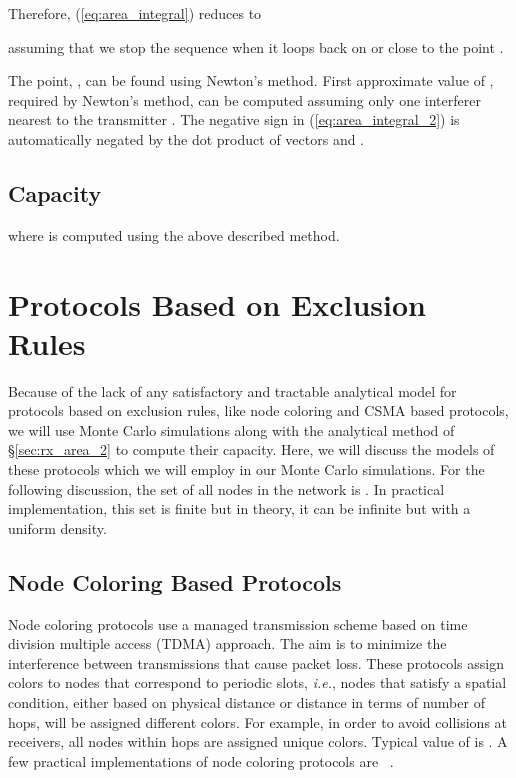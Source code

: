 \documentclass[12pt,english]{article}
\begin{document}
Therefore, (\ref{eq:area_integral}) reduces to

assuming that we stop the sequence  when it loops back on or close to the point . 

The point, \mbox{}, can be found using Newton's method. First approximate value of , required by Newton's method, can be computed assuming only one interferer nearest to the transmitter . The negative sign in (\ref{eq:area_integral_2}) is automatically negated by the dot product of vectors  and .

\subsection{Capacity}

 
where  is computed using the above described method. 

\section{Protocols Based on Exclusion Rules}
\label{sec:practical}

Because of the lack of any satisfactory and tractable analytical model for protocols based on exclusion rules, like node coloring and CSMA based protocols, we will use Monte Carlo simulations along with the analytical method of \S \ref{sec:rx_area_2} to compute their capacity. Here, we will discuss the models of these protocols which we will employ in our Monte Carlo simulations. For the following discussion, the set of all nodes in the network is . In practical implementation, this set is finite but in theory, it can be infinite but with a uniform density.

\subsection{Node Coloring Based Protocols}
\label{sec:tdma}

Node coloring protocols use a managed transmission scheme based on time division multiple access (TDMA) approach. The aim is to minimize the interference between transmissions that cause packet loss. These protocols assign colors to nodes that correspond to periodic slots, {\it i.e.}, nodes that satisfy a spatial condition, either based on physical distance or distance in terms of number of hops, will be assigned different colors. For example, in order to avoid collisions at receivers, all nodes within  hops are assigned unique colors. Typical value of   is . A few practical implementations of node coloring protocols are ~\cite{unified,NAMA,SEEDEX,FPRP,DRAND}. 
\end{document}

